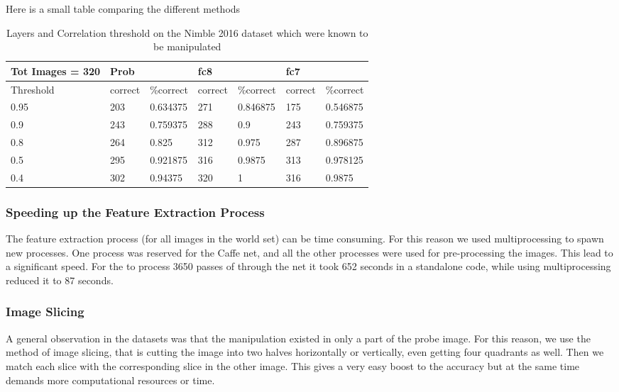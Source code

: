 \documentclass{article}
\begin{document}
Here is a small table comparing the different methods

\begin{table}[H]
\centering
\caption{Layers and Correlation threshold on the Nimble 2016 dataset which were known to be manipulated}
\label{lct}
\begin{tabular}{|l|l|l|l|l|ll|}
  \hline
  Tot Images = 320 & \multicolumn{2}{|l|}{Prob} & \multicolumn{2}{|l|}{fc8} & \multicolumn{2}{|l|}{fc7} \\
  \hline
  \multicolumn{1}{|l|}{Threshold} & correct    & \%correct   & correct   & \%correct   & correct   & \%correct   \\
  \hline
  0.95             & 203        & 0.634375    & 271       & 0.846875    & 175       & 0.546875    \\
  0.9              & 243        & 0.759375    & 288       & 0.9         & 243       & 0.759375    \\
  0.8              & 264        & 0.825       & 312       & 0.975       & 287       & 0.896875    \\
  0.5              & 295        & 0.921875    & 316       & 0.9875      & 313       & 0.978125    \\
  0.4              & 302        & 0.94375     & 320       & 1           & 316       & 0.9875      \\
  \hline

\end{tabular}
\end{table}

\subsubsection{Speeding up the Feature Extraction Process}
The feature extraction process (for all images in the world set) can be time consuming. For this reason we used multiprocessing to spawn new processes. One process was reserved for the Caffe net, and all the other processes were used for pre-processing the images. This lead to a significant speed. For the to process 3650 passes of through the net it took 652 seconds in a standalone code, while using multiprocessing reduced it to 87 seconds.


\subsubsection{Image Slicing}
A general observation in the datasets was that the manipulation existed in only a part of the probe image. For this reason, we use the method of image slicing, that is cutting the image into two halves horizontally or vertically, even getting four quadrants as well. Then we match each slice with the corresponding slice in the other image. This gives a very easy boost to the accuracy but at the same time demands more computational resources or time.
\end{document}
